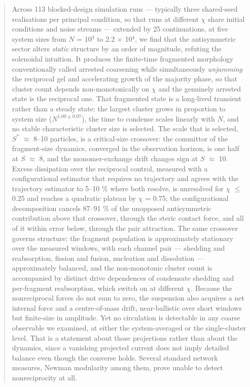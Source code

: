 \documentclass[aps,pre,preprint,superscriptaddress,nofootinbib,longbibliography]{revtex4-2}
\begin{document}
\begin{abstract}
Across 113 blocked-design simulation runs --- typically three shared-seed realisations per principal condition, so that runs at different $\chi$ share initial conditions and noise streams --- extended by 25 continuations, at five system sizes from $N$ = 10$^{3}$ to 2.2 $\times$ 10$^{4}$, we find that the antisymmetric sector alters \emph{static} structure by an order of magnitude, refuting the solenoidal intuition. It produces the finite-time fragmented morphology conventionally called arrested coarsening while simultaneously \emph{unjamming} the reciprocal gel and accelerating growth of the majority phase, so that cluster count depends non-monotonically on $\chi$ and the genuinely arrested state is the reciprocal one. That fragmented state is a long-lived transient rather than a steady state: the largest cluster grows in proportion to system size ($N^{1.00\pm0.07}$), the time to condense scales linearly with $N$, and no stable characteristic cluster size is selected. The scale that is selected, $S^*$ $\approx$ 8--10 particles, is a critical-size crossover: the committor of the fragment-size dynamics, converged in the observation horizon, is one half at $S$ $\approx$ 8, and the monomer-exchange drift changes sign at $S$ $\approx$ 10. Excess dissipation over the reciprocal control, measured with a configurational estimator that requires no trajectory and agrees with the trajectory estimator to 5--10 \% where both resolve, is unresolved for $\chi$ $\le$ 0.25 and reaches a quadratic plateau by $\chi$ = 0.75; the configurational decomposition cancels 87--91 \% of the unopposed antisymmetric contribution above that crossover, through the steric contact force, and all of it within error below, through the pair attraction. The same crossover governs structure: the fragment population is approximately stationary over the measured windows, with each channel pair --- shedding and reabsorption, fission and fusion, nucleation and dissolution --- approximately balanced, and the non-monotonic cluster count is accompanied by distinct drive dependences of condensate shedding and per-fragment reabsorption, which switch on at different $\chi$. Because the nonreciprocal forces do not sum to zero, the suspension also acquires a net internal force and a centre-of-mass drift, near-ballistic over short windows but finite-size in amplitude. Yet no circulation is detectable in any coarse observable we examined, at either the system-averaged or the single-cluster level. That is a statement about those projections rather than about the dynamics, since a vanishing projected current does not imply detailed balance even though the converse holds. Several standard network measures, Newman modularity among them, prove unable to detect nonreciprocity at all.


\end{abstract}
\end{document}
